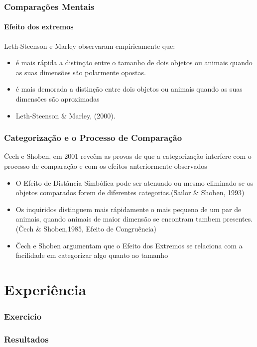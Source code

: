 \documentclass{beamer}
\begin{document}
\begin{frame}
	\frametitle{Comparações Mentais}
	\framesubtitle{Efeito dos extremos}

	Leth-Steenson e Marley observaram empiricamente que:
	\begin{itemize}
		\item é mais rápida a distinção entre o tamanho de dois objetos ou animais quando as suas dimensões são polarmente opostas.
		\item é mais demorada a distinção entre dois objetos ou animais quando as suas dimensões são aproximadas
		\item Leth-Steenson \& Marley, (2000).
	\end{itemize}
\end{frame}
\begin{frame}
	\frametitle{Categorização e o Processo de Comparação}
	Čech e Shoben, em 2001 reveêm as provas de que a categorização interfere com o processo de comparação e com os efeitos anteriormente observados
	
	\begin{itemize}
		\item O Efeito de Distância Simbólica pode ser atenuado ou mesmo eliminado se os objetos comparados forem de diferentes categorias.(Sailor \& Shoben, 1993)
		\item Os inquiridos distinguem mais rápidamente o mais pequeno de um par de animais, quando animais de maior dimensão se encontram tambem presentes. (Čech \& Shoben,1985, Efeito de Congruência)
		\item Čech e Shoben argumentam que o Efeito dos Extremos se relaciona com a facilidade em categorizar algo quanto ao tamanho  		
	\end{itemize} 
\end{frame}
\section{Experiência}
\begin{frame}
	\frametitle{Exercicio}
\end{frame}
\begin{frame}
	\frametitle{Resultados}
\end{frame}
\end{document}
